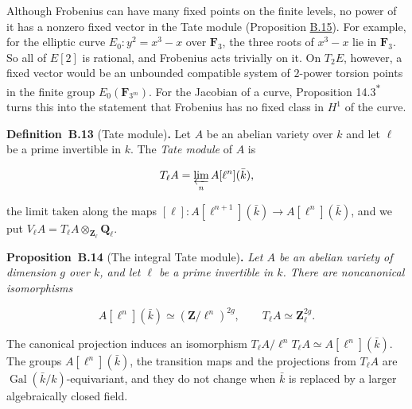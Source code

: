 \documentclass[11pt]{article}
\newenvironment{bpstatement}[2]{\par\addvspace{0.6\baselineskip}\noindent\textbf{#1}#2\textbf{.}\enspace\ignorespaces}
  {\par\addvspace{0.4\baselineskip}}
\newenvironment{bpstatementit}[2]{\begin{bpstatement}{#1}{#2}\itshape\ignorespaces}{\end{bpstatement}}
\newcommand{\bpout}[1]{#1\textsuperscript{\hyperlink{bp-outside}{\ensuremath{\ast}}}}
\begin{document}
Although Frobenius can have many fixed points on the finite levels, no power of it has a nonzero fixed vector in the Tate module (Proposition \hyperref[bp117]{B.15}). For example, for the elliptic curve \(E_0:y^2=x^3-x\) over \(\mathbf F_3\), the three roots of \(x^3-x\) lie in \(\mathbf F_3\). So all of \(E[2]\) is rational, and Frobenius acts trivially on it. On \(T_2E\), however, a fixed vector would be an unbounded compatible system of \(2\)-power torsion points in the finite group \(E_0(\mathbf F_{3^m})\). For the Jacobian of a curve, Proposition \bpout{14.3} turns this into the statement that Frobenius has no fixed class in \(H^1\) of the curve.

\label{bp113}%
\begin{bpstatement}{Definition~B.13}{ (Tate module)}
Let \(A\) be an abelian variety over \(k\) and let \(\ell\) be a prime invertible in \(k\). The \emph{Tate module} of \(A\) is

\[
T_\ell A=\varprojlim_n A[\ell^n](\bar k),
\]

the limit taken along the maps \([\ell]:A[\ell^{n+1}](\bar k)\to
A[\ell^n](\bar k)\), and we put \(V_\ell A=T_\ell A\otimes_{\mathbf Z_\ell}\mathbf Q_\ell\).
\end{bpstatement}

\label{bp114}%
\begin{bpstatementit}{Proposition~B.14}{ (The integral Tate module)}
Let \(A\) be an abelian variety of dimension \(g\) over \(k\), and let \(\ell\) be a prime invertible in \(k\). There are noncanonical isomorphisms

\[
A[\ell^n](\bar k)\simeq(\mathbf Z/\ell^n)^{2g},\qquad
T_\ell A\simeq\mathbf Z_\ell^{2g}.
\]

The canonical projection induces an isomorphism \(T_\ell A/\ell^nT_\ell A\simeq A[\ell^n](\bar k)\). The groups \(A[\ell^n](\bar k)\), the transition maps and the projections from \(T_\ell A\) are \(\operatorname{Gal}(\bar k/k)\)-equivariant, and they do not change when \(\bar k\) is replaced by a larger algebraically closed field.
\end{bpstatementit}
\end{document}
